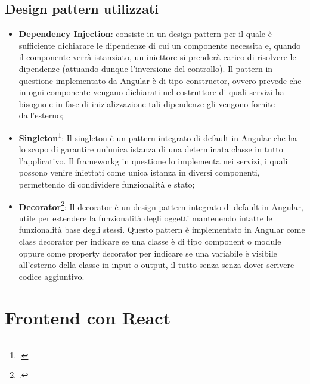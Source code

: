 \subsection{Design pattern utilizzati}
\begin{itemize}
	\item \textbf{Dependency Injection}: consiste in un design pattern per il quale è sufficiente dichiarare le dipendenze di cui un componente necessita e, quando il componente verrà istanziato, un iniettore si prenderà carico di risolvere le dipendenze (attuando dunque l'inversione del controllo). Il pattern in questione implementato da Angular è di tipo \textsf{constructor}, ovvero prevede che in ogni componente vengano dichiarati nel costruttore di quali servizi ha bisogno e in fase di inizializzazione tali dipendenze gli vengono fornite dall'esterno;
	\item \textbf{Singleton}\footcite{gamma:design-patterns}: Il singleton è un pattern integrato di default in Angular che ha lo scopo di garantire un'unica istanza di una determinata classe in tutto l'applicativo. Il \gls{frameworkg} in questione lo implementa nei \textsf{servizi}, i quali possono venire iniettati come unica istanza in diversi componenti, permettendo di condividere funzionalità e stato;
	\item \textbf{Decorator}\footcite{gamma:design-patterns}: Il decorator è un design pattern integrato di default in Angular, utile per estendere la funzionalità degli oggetti mantenendo intatte le funzionalità base degli stessi. Questo pattern è implementato in Angular come \textsf{class decorator} per indicare se una classe è di tipo component o module oppure come \textsf{property decorator} per indicare se una variabile è visibile all'esterno della classe in input o output, il tutto senza senza dover scrivere codice aggiuntivo.
\end{itemize}


\section{Frontend con React}
